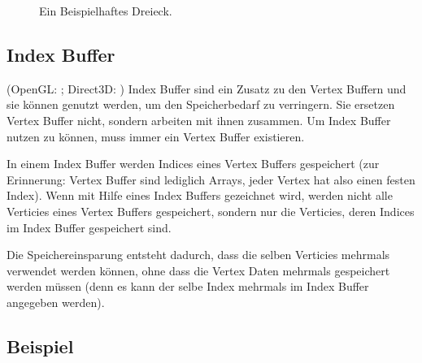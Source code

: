 \begin{figure}
    \caption{Ein Beispielhaftes Dreieck.}
    \label{fig:vertexwinding}
    \begin{center}
    \end{center}
\end{figure}

\subsection{Index Buffer}
(OpenGL: \cite{stage_gl_vertex_spec}; Direct3D: \cite{d3d_buffers})
Index Buffer sind ein Zusatz zu den Vertex Buffern und sie können genutzt werden, um den Speicherbedarf zu verringern. Sie ersetzen Vertex Buffer nicht, sondern arbeiten mit ihnen zusammen. Um Index Buffer nutzen zu können, muss immer ein Vertex Buffer existieren. 

In einem Index Buffer werden Indices eines Vertex Buffers gespeichert (zur Erinnerung: Vertex Buffer sind lediglich Arrays, jeder Vertex hat also einen festen Index). Wenn mit Hilfe eines Index Buffers gezeichnet wird, werden nicht alle Verticies eines Vertex Buffers gespeichert, sondern nur die Verticies, deren Indices im Index Buffer gespeichert sind.

Die Speichereinsparung entsteht dadurch, dass die selben Verticies mehrmals verwendet werden können, ohne dass die Vertex Daten mehrmals gespeichert werden müssen (denn es kann der selbe Index mehrmals im Index Buffer angegeben werden).

\subsection{Beispiel}

